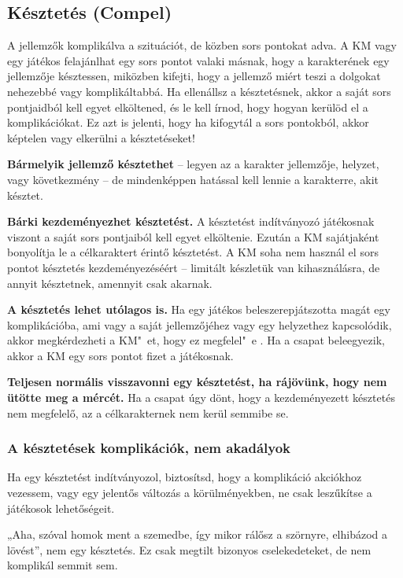 \label{Késztetés}
\subsection[Késztetés]{Késztetés (Compel)}

A jellemzők  komplikálva a szituációt, de közben sors pontokat adva. A KM vagy egy játékos felajánlhat egy sors pontot valaki másnak, hogy a karakterének egy jellemzője késztessen, miközben kifejti, hogy a jellemző miért teszi a dolgokat nehezebbé vagy komplikáltabbá. Ha ellenállsz a késztetésnek, akkor a saját sors pontjaidból kell egyet elköltened, és le kell írnod, hogy hogyan kerülöd el a komplikációkat. Ez azt is jelenti, hogy ha kifogytál a sors pontokból, akkor képtelen vagy elkerülni a késztetéseket!

\textbf{Bármelyik jellemző késztethet} -- legyen az a karakter jellemzője, helyzet, vagy következmény -- de mindenképpen hatással kell lennie a karakterre, akit késztet.

\textbf{Bárki kezdeményezhet késztetést.} A késztetést indítványozó játékosnak viszont a saját sors pontjaiból kell egyet elköltenie. Ezután a KM sajátjaként bonyolítja le a célkaraktert érintő késztetést. A KM soha nem használ el sors pontot késztetés kezdeményezéséért -- limitált készletük van kihasználásra, de annyit késztetnek, amennyit csak akarnak.

\textbf{A késztetés lehet utólagos is.} Ha egy játékos beleszerepjátszotta magát egy komplikációba, ami vagy a saját jellemzőjéhez vagy egy helyzethez kapcsolódik, akkor megkérdezheti a KM"~et, hogy ez megfelel"~e . Ha a csapat beleegyezik, akkor a KM egy sors pontot fizet a játékosnak.

\textbf{Teljesen normális visszavonni egy késztetést, ha rájövünk, hogy nem ütötte meg a mércét.} Ha a csapat úgy dönt, hogy a kezdeményezett késztetés nem megfelelő, az a célkarakternek nem kerül semmibe se.

\subsubsection{A késztetések komplikációk, nem akadályok}

Ha egy késztetést indítványozol, biztosítsd, hogy a komplikáció akciókhoz vezessem, vagy egy jelentős változás a körülményekben, ne csak leszűkítse a játékosok lehetőségeit.

„Aha, szóval homok ment a szemedbe, így mikor rálősz a szörnyre, elhibázod a lövést”, nem egy késztetés. Ez csak megtilt bizonyos cselekedeteket, de nem komplikál semmit sem.

